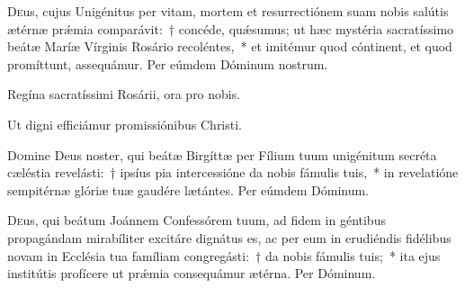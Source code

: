 \documentclass[vesperale_romanum.tex]{subfiles}
\begin{document}
\admagnificat
 
 \oratio
 
 \lettrine{D}{e}us, cujus Unigénitus per vitam, mortem et resurrectiónem suam nobis salútis ætérnæ prǽmia comparávit:~† concéde, quǽsumus; ut hæc mystéria sacratíssimo beátæ Maríæ Vírginis Rosário recoléntes,~* et imitémur quod cóntinent, et quod promíttunt, assequámur. Per eúmdem Dóminum nostrum.
 
 


\omniapraeter

\hymnus


\vv Regína sacratíssimi Rosárii, ora pro nobis.

\rr Ut digni efficiámur promissiónibus Christi.

\admagnificat

\commemoration

\myrule


\duplex


\oratio

\lettrine{D}{o}mine Deus noster, qui beátæ Birgíttæ per Fílium tuum unigénitum secréta cæléstia revelásti:~† ipsíus pia intercessióne da nobis fámulis tuis,~* in revelatióne sempitérnæ glóriæ tuæ gaudére lætántes.
Per eúmdem Dóminum.

\capitdeseq

\myrule


\duplex

\oratio

\lettrine{D}{e}us, qui beátum Joánnem Confessórem tuum, ad fidem in géntibus propagándam mirabíliter excitáre dignátus es, ac per eum in erudiéndis fidélibus novam in Ecclésia tua famíliam congregásti:~† da nobis fámulis tuis;~* ita ejus institútis profícere ut prǽmia consequámur ætérna.
Per Dóminum.
\end{document}

